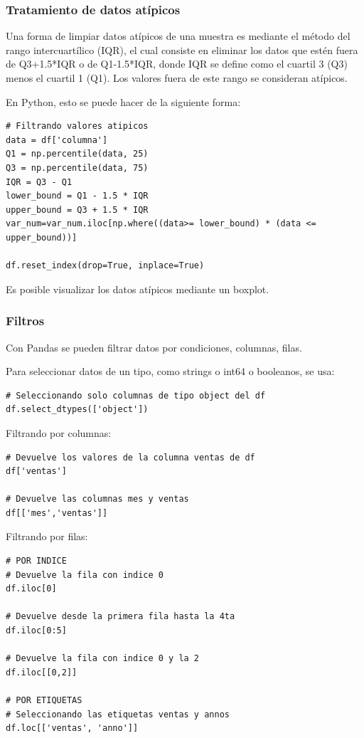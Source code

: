 \documentclass[a4paper, 12pt]{book}
\begin{document}
\subsubsection{Tratamiento de datos atípicos}
Una forma de limpiar datos atípicos de una muestra es mediante el método del rango intercuartílico (IQR), el cual consiste en eliminar los datos que estén fuera de Q3+1.5*IQR o de Q1-1.5*IQR, donde IQR se define como el cuartil 3 (Q3) menos el cuartil 1 (Q1). Los valores fuera de este rango se consideran atípicos.

En Python, esto se puede hacer de la siguiente forma:
\begin{verbatim}
# Filtrando valores atipicos
data = df['columna']
Q1 = np.percentile(data, 25)
Q3 = np.percentile(data, 75)
IQR = Q3 - Q1
lower_bound = Q1 - 1.5 * IQR
upper_bound = Q3 + 1.5 * IQR
var_num=var_num.iloc[np.where((data>= lower_bound) * (data <= upper_bound))]

df.reset_index(drop=True, inplace=True)
\end{verbatim}
Es posible visualizar los datos atípicos mediante un boxplot.
\subsubsection{Filtros}
Con Pandas se pueden filtrar datos por condiciones, columnas, filas.


Para seleccionar datos de un tipo, como strings o int64 o booleanos, se usa:
\begin{verbatim}
# Seleccionando solo columnas de tipo object del df
df.select_dtypes(['object'])
\end{verbatim}


Filtrando por columnas:
\begin{verbatim}
# Devuelve los valores de la columna ventas de df
df['ventas']
	
# Devuelve las columnas mes y ventas
df[['mes','ventas']]
\end{verbatim}

Filtrando por filas:
\begin{verbatim}
# POR INDICE
# Devuelve la fila con indice 0
df.iloc[0]
	
# Devuelve desde la primera fila hasta la 4ta
df.iloc[0:5]
	
# Devuelve la fila con indice 0 y la 2
df.iloc[[0,2]]
	
# POR ETIQUETAS
# Seleccionando las etiquetas ventas y annos
df.loc[['ventas', 'anno']]
\end{verbatim}
\end{document}
